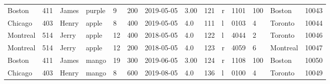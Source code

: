 \documentclass{article}
\begin{document}
\begin{enumerate}
\begin{table}[h]
\begin{adjustbox}{width=1.1\textwidth}
\begin{tabular}{llllllllllllll}
			Boston  & 411 & James & purple & 9  & 200 & 2019-05-05 & 3.00 & 121  & r & 1101 & 100  & Boston  & 10043  \\
			Chicago & 403 & Henry & apple & 8 & 400 & 2019-05-05 & 4.0 & 111 & l  & 0103 &4 & Toronto & 10044\\
			Montreal & 514 & Jerry & apple & 12 & 400 & 2018-05-05 & 4.0 & 122 & l  & 4044 &2 & Toronto & 10046\\
			Montreal & 514 & Jerry & apple & 12 & 200 & 2018-05-05 & 4.0 & 123 & r  & 4059 &6 & Montreal & 10047\\
			Boston  & 411 & James & mango & 19  & 300 & 2019-06-05 & 3.00 & 124  & r & 1108 & 100  & Boston  & 10050  \\
			Chicago & 403 & Henry & mango & 8 & 600 & 2019-08-05 & 4.0 & 136 & l  & 0100 &4 & Toronto & 10049\\
			

\end{tabular}
\end{adjustbox}
\end{table}
\end{enumerate}
\end{document}
